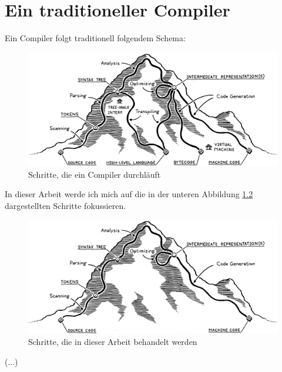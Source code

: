 \chapter{Ein traditioneller Compiler} \label{cha:3-Tradional_Compiler}

Ein Compiler folgt traditionell folgendem Schema:

\begin{figure}[h!]
    \centering
    \includegraphics[scale=0.2]{resources/images/mountain.png}
    \caption[Schritte, die ein Compiler durchläuft (https://github.com/munificent/craftinginterpreters, besucht am 5.8.2024)]{Schritte, die ein Compiler durchläuft}
    \label{fig:mountain}
\end{figure}

In dieser Arbeit werde ich mich auf die in der unteren Abbildung \ref{fig:mountain-edited} dargestellten Schritte fokussieren.

\begin{figure}[h!]
    \centering
    \includegraphics[scale=0.2]{resources/images/mountain-edited.png}
    \caption[Schritte, die in dieser Arbeit behandelt werden (Basierend auf Bild \ref{fig:mountain})]{Schritte, die in dieser Arbeit behandelt werden}
    \label{fig:mountain-edited}
\end{figure}

(...)

